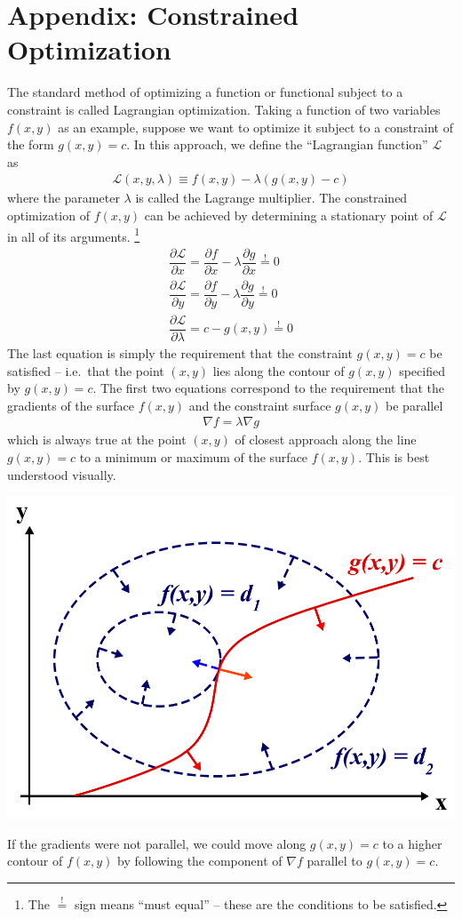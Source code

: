 \documentclass[11pt]{article}
\newcommand{\la}{\ensuremath{\lambda}}
\newcommand{\mc}[1]{\ensuremath{\mathcal{#1}}}
\newcommand{\pd}[2]{\ensuremath{\dfrac{\partial#1}{\partial #2}}}
\theoremstyle{indented}
\begin{document}
\section{Appendix: Constrained Optimization}
\label{constrained-optimization}
The standard method of optimizing a function or functional subject to a constraint is called Lagrangian optimization.
Taking a function of two variables $f(x,y)$ as an example, suppose we want to optimize it subject to a constraint of the form $g(x,y)=c$.
In this approach, we define the ``Lagrangian function'' $\mc{L}$ as
\begin{align*}
	\mc{L}(x,y,\la)
\equiv
	f(x,y)
-
	\la(g(x,y)-c)
\end{align*}
where the parameter $\la$ is called the Lagrange multiplier.
The constrained optimization of $f(x,y)$ can be achieved by determining a stationary point of $\mc{L}$ in all of its arguments. \footnote{The $\overset{!}=$ sign means ``must equal'' -- these are the conditions to be satisfied.}
\begin{align*}
	\pd{\mc{L}}{x}
=
	\pd{f}{x}
-
	\la\pd{g}{x}
\overset{!}=0
\\
	\pd{\mc{L}}{y}
=
	\pd{f}{y}
-
	\la\pd{g}{y}
\overset{!}=0
\\
	\pd{\mc{L}}{\la}
=
	c
-
	g(x,y)
\overset{!}=0
\end{align*}
The last equation is simply the requirement that the constraint $g(x,y)=c$ be satisfied -- i.e.\ that the point $(x,y)$ lies along the contour of $g(x,y)$ specified by $g(x,y)=c$.
The first two equations correspond to the requirement that the gradients of the surface $f(x,y)$ and the constraint surface $g(x,y)$ be parallel
\begin{align}
	\nabla f
=
	\la\nabla g
\end{align}
which is always true at the point $(x,y)$ of closest approach along the line $g(x,y)=c$ to a minimum or maximum of the surface $f(x,y)$.
This is best understood visually.
\begin{center}
	\includegraphics[width=0.5\linewidth]{figs/lagrangian-optimization.png}
\end{center}
If the gradients were not parallel, we could move along $g(x,y)=c$ to a higher contour of $f(x,y)$ by following the component of $\nabla f$ parallel to $g(x,y)=c$.
\end{document}
